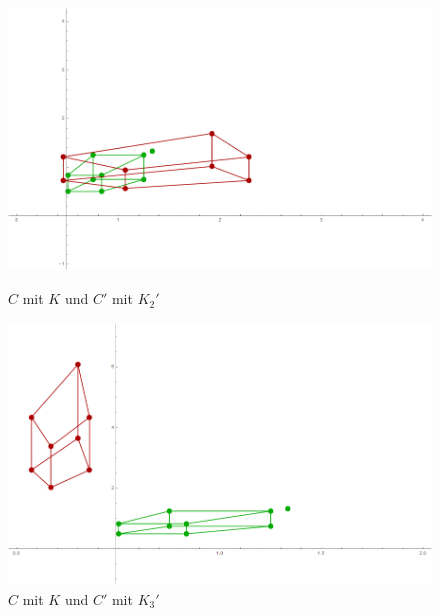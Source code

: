 \begin{figure}[!htb]
	\includegraphics[width=\linewidth]{images/Zeta32_12.png}
	\caption{$C$ mit $K$ und $C'$ mit $K_2'$}
	\label{fig:K2}
	\endminipage\hfill
	\includegraphics[width=\linewidth]{images/Zeta05_43.png}
	\caption{$C$ mit $K$ und $C'$ mit $K_3'$}
	\label{fig:K3}
	\endminipage\hfill
\end{figure}



%

